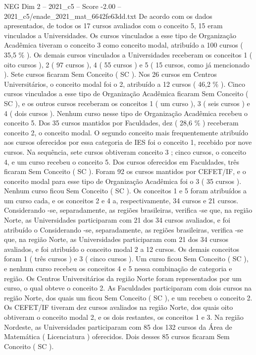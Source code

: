 \begin{textsample}{NEG Dim 2 – 2021\_c5 – Score -2.00 – 2021\_c5/enade\_2021\_mat\_6642fe63dd.txt}
De acordo com os dados apresentados, de todos os 17 cursos avaliados com o conceito 5, 15 eram vinculados a Universidades.
Os cursos vinculados a esse tipo de Organização Acadêmica tiveram o conceito 3 como conceito modal, atribuído a 100 cursos ( 35,5 \% ).
Os demais cursos vinculados a Universidades receberam os conceitos 1 ( oito cursos ), 2 ( 97 cursos ), 4 ( 55 cursos ) e 5 ( 15 cursos, como já mencionado ).
Sete cursos ficaram Sem Conceito ( SC ).
Nos 26 cursos em Centros Universitários, o conceito modal foi o 2, atribuído a 12 cursos ( 46,2 \% ).
Cinco cursos vinculados a esse tipo de Organização Acadêmica ficaram Sem Conceito ( SC ), e os outros cursos receberam os conceitos 1 ( um curso ), 3 ( seis cursos ) e 4 ( dois cursos ).
Nenhum curso nesse tipo de Organização Acadêmica recebeu o conceito 5.
Dos 35 cursos mantidos por Faculdades, dez ( 28,6 \% ) receberam conceito 2, o conceito modal.
O segundo conceito mais frequentemente atribuído aos cursos oferecidos por essa categoria de IES foi o conceito 1, recebido por nove cursos.
Na sequência, sete cursos obtiveram conceito 3 ; cinco cursos, o conceito 4, e um curso recebeu o conceito 5.
Dos cursos oferecidos em Faculdades, três ficaram Sem Conceito ( SC ).
Foram 92 os cursos mantidos por CEFET/IF, e o conceito modal para esse tipo de Organização Acadêmica foi o 3 ( 35 cursos ).
Nenhum curso ficou Sem Conceito ( SC ).
Os conceitos 1 e 5 foram atribuídos a um curso cada, e os conceitos 2 e 4 a, respectivamente, 34 cursos e 21 cursos.
Considerando -se, separadamente, as regiões brasileiras, verifica -se que, na região Norte, as Universidades participaram com 21 dos 34 cursos avaliados, e foi atribuído o Considerando -se, separadamente, as regiões brasileiras, verifica -se que, na região Norte, as Universidades participaram com 21 dos 34 cursos avaliados, e foi atribuído o conceito modal 2 a 12 cursos.
Os demais conceitos foram 1 ( três cursos ) e 3 ( cinco cursos ).
Um curso ficou Sem Conceito ( SC ), e nenhum curso recebeu os conceitos 4 e 5 nessa combinação de categoria e região.
Os Centros Universitários da região Norte foram representados por um curso, o qual obteve o conceito 2.
As Faculdades participaram com dois cursos na região Norte, dos quais um ficou Sem Conceito ( SC ), e um recebeu o conceito 2.
Os CEFET/IF tiveram dez cursos avaliados na região Norte, dos quais oito obtiveram o conceito modal 2, e os dois restantes, os conceitos 1 e 3.
Na região Nordeste, as Universidades participaram com 85 dos 132 cursos da Área de Matemática ( Licenciatura ) oferecidos.
Dois desses 85 cursos ficaram Sem Conceito ( SC ).

\end{textsample}
